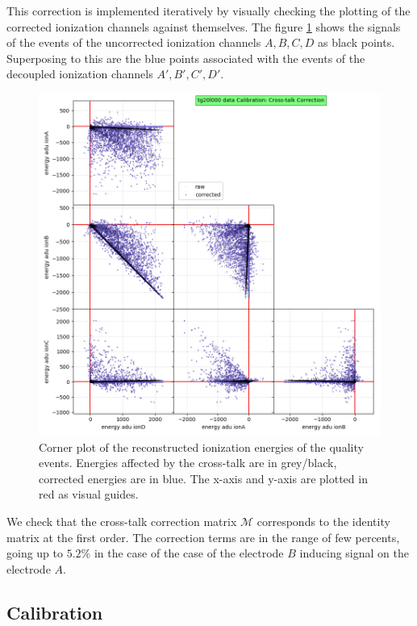 This correction is implemented iteratively by visually checking the plotting of the corrected ionization channels against themselves. The figure \ref{fig:crosstalk-correction} shows the signals of the events of the uncorrected ionization channels $A, B, C, D$ as black points. Superposing to this are the blue points associated with the events of the decoupled ionization channels $A', B', C', D'$.

\begin{figure}
\centering
\includegraphics[width=\linewidth,]{Figures/Neutron/crosstalk_correction.png}
\caption{Corner plot of the reconstructed ionization energies of the quality events. Energies affected by the cross-talk are in grey/black, corrected energies are in blue. The x-axis and y-axis are plotted in red as visual guides.}
\label{fig:crosstalk-correction}
\end{figure}

We check that the cross-talk correction matrix $\mathcal{M}$ corresponds to the identity matrix at the first order. The correction terms are in the range of few percents, going up to $5.2\%$ in the case of the case of the electrode $B$ inducing signal on the electrode $A$.


\subsection{Calibration}
\label{par:calibration}

